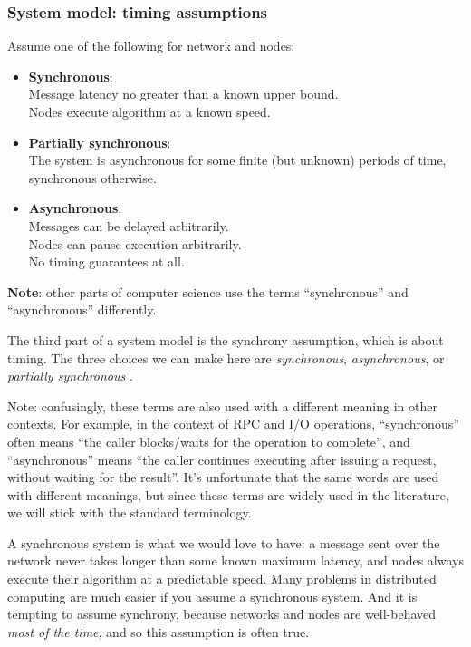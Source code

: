 \begin{frame}
    \label{s:model-synchrony}
    \frametitle{System model: timing assumptions}
    Assume one of the following for network and nodes:
    \begin{itemize}
        \item \textbf{Synchronous}:\\
            Message latency no greater than a known upper bound.\\
            Nodes execute algorithm at a known speed.\pause
        \item \textbf{Partially synchronous}:\\
            The system is asynchronous for some finite (but unknown) periods of time, synchronous otherwise.\pause
        \item \textbf{Asynchronous}:\\
            Messages can be delayed arbitrarily.\\
            Nodes can pause execution arbitrarily.\\
            No timing guarantees at all.\\[1em]
    \end{itemize}
    \textbf{Note}: other parts of computer science use the terms ``synchronous'' and ``asynchronous'' differently.
\end{frame}
\label{l:model-synchrony}

The third part of a system model is the synchrony assumption, which is about timing.
The three choices we can make here are \emph{synchronous}, \emph{asynchronous}, or \emph{partially synchronous} \citep{Dwork:1988dr}.

\begin{mdframed}
Note: confusingly, these terms are also used with a different meaning in other contexts.
For example, in the context of RPC and I/O operations, ``synchronous'' often means ``the caller blocks/waits for the operation to complete'', and ``asynchronous'' means ``the caller continues executing after issuing a request, without waiting for the result''.
It's unfortunate that the same words are used with different meanings, but since these terms are widely used in the literature, we will stick with the standard terminology.
\end{mdframed}

A synchronous system is what we would love to have: a message sent over the network never takes longer than some known maximum latency, and nodes always execute their algorithm at a predictable speed.
Many problems in distributed computing are much easier if you assume a synchronous system.
And it is tempting to assume synchrony, because networks and nodes are well-behaved \emph{most of the time}, and so this assumption is often true.


